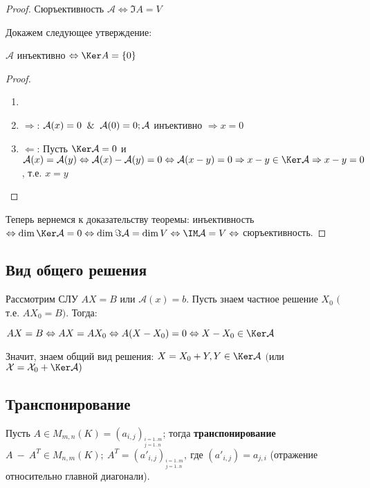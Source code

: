 \begin{proof}
    Сюръективность $\mathcal{A}\Leftrightarrow \Im A=V$
    
    Докажем следующее утверждение:
    \begin{statement}
        $\mathcal{A} $ инъективно $ \Leftrightarrow \Ker A=\{0\}$
    \end{statement}
    \begin{proof}
        \begin{enumerate}
            \item[]
            \item[\circ] $\Rightarrow$: $\mathcal{A}(x)=0\And 
\mathcal{A}(0)=0; \mathcal{A}$ инъективно $\Rightarrow x=0$
            \item[\circ] $\Leftarrow$: Пусть $\Ker \mathcal{A}=0$ и 
$\mathcal{A}(x)=\mathcal{A}(y)\Leftrightarrow 
\mathcal{A}(x)-\mathcal{A}(y)=0\Leftrightarrow 
\mathcal{A}(x-y)=0\Rightarrow x-y\in \Ker \mathcal{A} \Rightarrow x-y =0$, 
т.е. $x=y$
        \end{enumerate}
    \end{proof}
    Теперь вернемся к доказательству теоремы: инъективность 
$\Leftrightarrow \dim \Ker \mathcal{A}=0\Leftrightarrow \dim \Im 
\mathcal{A}=\dim V \Leftrightarrow \IM \mathcal{A} = V \Leftrightarrow $ 
сюръективность.
\end{proof}

\subsection{Вид общего решения}

Рассмотрим СЛУ $AX=B$ или $\mathcal{A}(x)=b$. Пусть знаем частное решение 
$X_0$ $($т.е. $AX_0=B)$. Тогда: 

$AX=B \Leftrightarrow AX=AX_0 \Leftrightarrow A(X-X_0)=0 \Leftrightarrow 
X-X_0\in \Ker \mathcal{A}$

Значит, знаем общий вид решения: $X=X_0+Y, Y\in \Ker \mathcal{A}$ $($или 
$\mathcal{X}=\mathcal{X}_0+\Ker \mathcal{A})$

\subsection{Транспонирование}

\begin{definition}
    Пусть $A\in M_{m,n}(K)=(a_{i,j})_{^{i=1..m}_{j=1..n}}$; тогда 
\textbf{транспонирование} $A\ -\ A^{T}\in M_{n,m}(K);\ 
A^T=(a'_{i,j})_{^{i=1..m}_{j=1..n}},\ $где $ (a'_{i,j})=a_{j,i}$ 
(отражение относительно главной диагонали).  
\end{definition}

